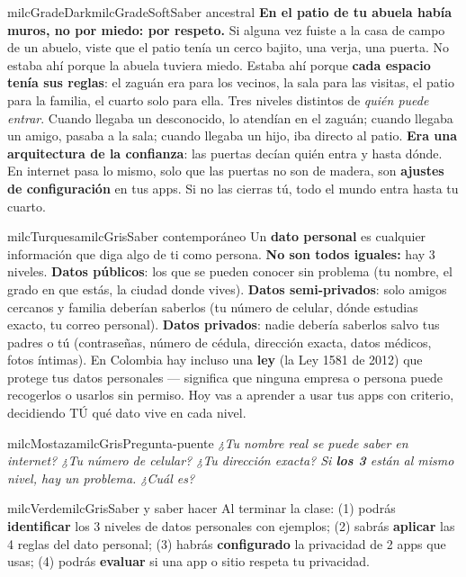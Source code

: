 \documentclass[11pt,letterpaper]{article}
\begin{document}
\begin{softbox}{milcGradeDark}{milcGradeSoft}{Saber ancestral}
\textbf{En el patio de tu abuela había muros, no por miedo: por respeto.} Si alguna vez fuiste a la casa de campo de un abuelo, viste que el patio tenía un cerco bajito, una verja, una puerta. No estaba ahí porque la abuela tuviera miedo. Estaba ahí porque \textbf{cada espacio tenía sus reglas}: el zaguán era para los vecinos, la sala para las visitas, el patio para la familia, el cuarto solo para ella. Tres niveles distintos de \emph{quién puede entrar}. Cuando llegaba un desconocido, lo atendían en el zaguán; cuando llegaba un amigo, pasaba a la sala; cuando llegaba un hijo, iba directo al patio. \textbf{Era una arquitectura de la confianza}: las puertas decían quién entra y hasta dónde. En internet pasa lo mismo, solo que las puertas no son de madera, son \textbf{ajustes de configuración} en tus apps. Si no las cierras tú, todo el mundo entra hasta tu cuarto.
\end{softbox}

\begin{softbox}{milcTurquesa}{milcGris}{Saber contemporáneo}
Un \textbf{dato personal} es cualquier información que diga algo de ti como persona. \textbf{No son todos iguales:} hay 3 niveles. \textbf{Datos públicos}: los que se pueden conocer sin problema (tu nombre, el grado en que estás, la ciudad donde vives). \textbf{Datos semi-privados}: solo amigos cercanos y familia deberían saberlos (tu número de celular, dónde estudias exacto, tu correo personal). \textbf{Datos privados}: nadie debería saberlos salvo tus padres o tú (contraseñas, número de cédula, dirección exacta, datos médicos, fotos íntimas). En Colombia hay incluso una \textbf{ley} (la Ley 1581 de 2012) que protege tus datos personales --- significa que ninguna empresa o persona puede recogerlos o usarlos sin permiso. Hoy vas a aprender a usar tus apps con criterio, decidiendo TÚ qué dato vive en cada nivel.
\end{softbox}

\begin{softbox}{milcMostaza}{milcGris}{Pregunta-puente}
\textit{¿Tu nombre real se puede saber en internet? ¿Tu número de celular? ¿Tu dirección exacta? Si \textbf{los 3} están al mismo nivel, hay un problema. ¿Cuál es?}
\end{softbox}

\begin{softbox}{milcVerde}{milcGris}{Saber y saber hacer}
Al terminar la clase: (1) podrás \textbf{identificar} los 3 niveles de datos personales con ejemplos; (2) sabrás \textbf{aplicar} las 4 reglas del dato personal; (3) habrás \textbf{configurado} la privacidad de 2 apps que usas; (4) podrás \textbf{evaluar} si una app o sitio respeta tu privacidad.
\end{softbox}
\end{document}
